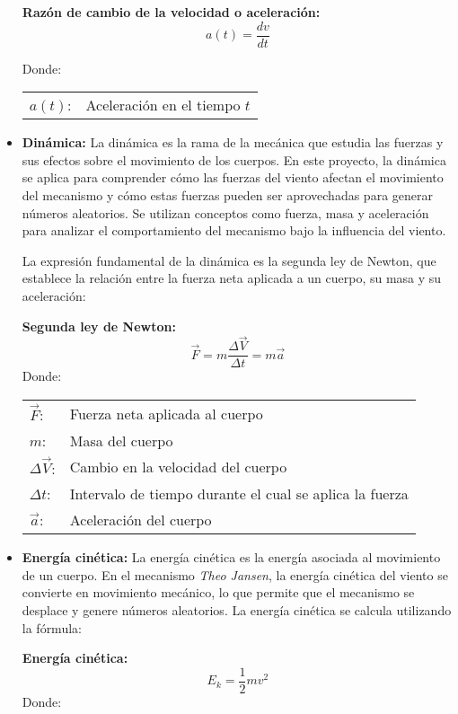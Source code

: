 \begin{itemize}
\textbf{Razón de cambio de la velocidad o aceleración:}
\begin{equation}
a(t) = \frac{dv}{dt}
\end{equation}

Donde:

\begin{tabular}{@{}ll}
  \(a(t)\): & Aceleración en el tiempo \(t\) \\
\end{tabular}


  \item \textbf{Dinámica:} La dinámica es la rama de la mecánica que estudia las fuerzas y sus efectos sobre el movimiento de los cuerpos. En este proyecto, la dinámica se aplica para comprender cómo las fuerzas del viento afectan el movimiento del mecanismo y cómo estas fuerzas pueden ser aprovechadas para generar números aleatorios. Se utilizan conceptos como fuerza, masa y aceleración para analizar el comportamiento del mecanismo bajo la influencia del viento.
  
  La expresión fundamental de la dinámica es la segunda ley de Newton, que establece la relación entre la fuerza neta aplicada a un cuerpo, su masa y su aceleración:

\textbf{Segunda ley de Newton:}
\begin{equation}
\vec{F} = m\dfrac{\Delta \vec{V}}{\Delta t} = m\vec{a}
\end{equation}
Donde:

\begin{tabular}{@{}ll}
  \(\vec{F}\): & Fuerza neta aplicada al cuerpo \\
  \(m\):      & Masa del cuerpo \\
  \(\Delta \vec{V}\): & Cambio en la velocidad del cuerpo \\
  \(\Delta t\): & Intervalo de tiempo durante el cual se aplica la fuerza \\
  \(\vec{a}\): & Aceleración del cuerpo \\
\end{tabular}


  \item \textbf{Energía cinética:} La energía cinética es la energía asociada al movimiento de un cuerpo. En el mecanismo \textit{Theo Jansen}, la energía cinética del viento se convierte en movimiento mecánico, lo que permite que el mecanismo se desplace y genere números aleatorios. La energía cinética se calcula utilizando la fórmula:
  
\textbf{Energía cinética:}
\begin{equation}
E_k = \frac{1}{2} m v^2
\end{equation}
Donde:


\end{itemize}
